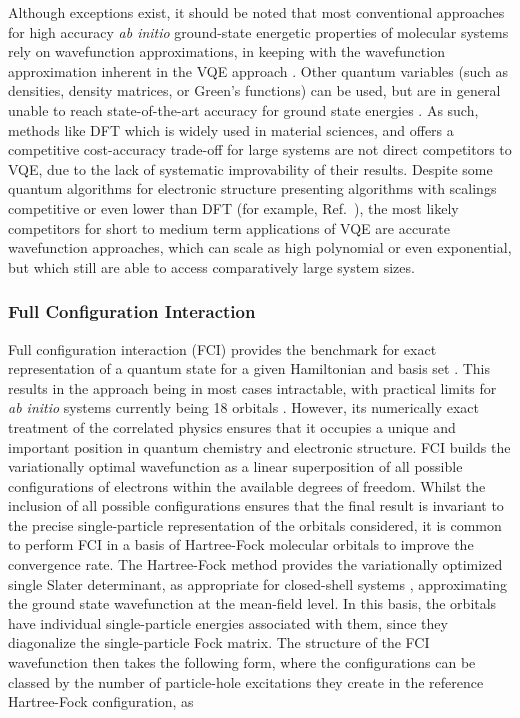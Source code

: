 Although exceptions exist, it should be noted that most conventional approaches for high accuracy {\em ab initio} ground-state energetic properties of molecular systems rely on wavefunction approximations, in keeping with the wavefunction approximation inherent in the VQE approach \cite{Eriksen2020}.
Other quantum variables (such as densities, density matrices, or Green's functions) can be used, but are in general unable to reach state-of-the-art accuracy for ground state energies \cite{Williams2020}. As such, methods like DFT which is widely used in material sciences, and offers a competitive cost-accuracy trade-off for large systems are not direct competitors to VQE, due to the lack of systematic improvability of their results. Despite some quantum algorithms for electronic structure presenting algorithms with scalings competitive or even lower than DFT (for example, Ref.~\cite{Babbush2019}), the most likely competitors for short to medium term applications of VQE are accurate wavefunction approaches, which can scale as high polynomial or even exponential, but which still are able to access comparatively large system sizes.

\subsubsection{Full Configuration Interaction} \label{sec:full_configuration_interaction}

Full configuration interaction (FCI) provides the benchmark for exact representation of a quantum state for a given Hamiltonian and basis set \cite{Szabo1996,DavidSherrill1999}. This results in the approach being in most cases intractable, with practical limits for {\em ab initio} systems currently being 18 orbitals \cite{Vogiatzis2017}. However, its numerically exact treatment of the correlated physics ensures that it occupies a unique and important position in quantum chemistry and electronic structure. FCI builds the variationally optimal wavefunction as a linear superposition of all possible configurations of electrons within the available degrees of freedom.
Whilst the inclusion of all possible configurations ensures that the final result is invariant to the precise single-particle representation of the orbitals considered, it is common to perform FCI in a basis of Hartree-Fock molecular orbitals to improve the convergence rate. The Hartree-Fock method provides the variationally optimized single Slater determinant, as appropriate for closed-shell systems \cite{Jensen2017}, approximating the ground state wavefunction at the mean-field level. In this basis, the orbitals have individual single-particle energies associated with them, since they diagonalize the single-particle Fock matrix. The structure of the FCI wavefunction then takes the following form, where the configurations can be classed by the number of particle-hole excitations they create in the reference Hartree-Fock configuration, as

